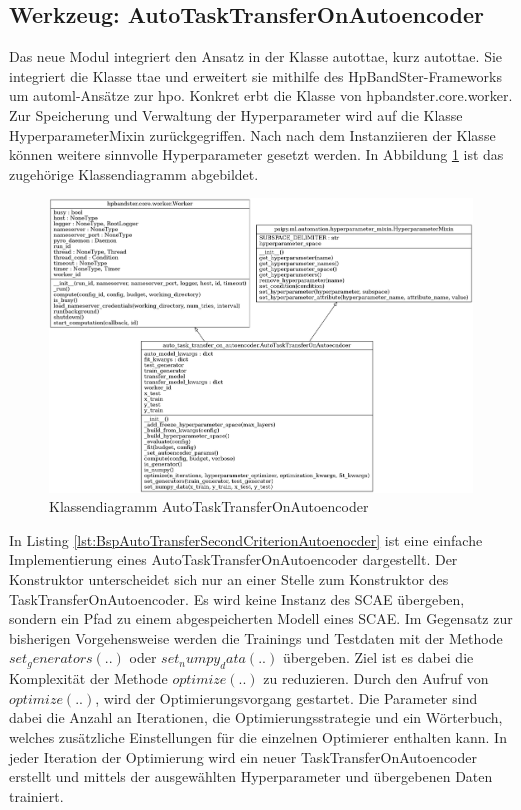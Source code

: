 	\subsection{Werkzeug: AutoTaskTransferOnAutoencoder}
	\label{subsec:AutoTaskTransferOnAutoencoder}
	Das neue Modul integriert den Ansatz in der Klasse \acl{autottae}, kurz \ac{autottae}. Sie integriert die Klasse \acl{ttae} und erweitert sie mithilfe des HpBandSter-Frameworks um \ac{automl}-Ansätze zur \ac{hpo}. Konkret erbt die Klasse von hpbandster.core.worker. Zur Speicherung und Verwaltung der Hyperparameter wird auf die Klasse HyperparameterMixin zurückgegriffen. Nach nach dem Instanziieren der Klasse können weitere sinnvolle Hyperparameter gesetzt werden.
	In Abbildung \ref{img:KlassendiagrammAutoTaskTransferOnAutoencoder}  ist das zugehörige Klassendiagramm abgebildet. 
	\begin{figure}[h]
		\centering
		\includegraphics[width=1\textwidth, center]{bilder/Klassendiagramme/AutoTTAE.png}
		\caption[Klassendiagramm AutoTaskTransferOnAutoencoder]{Klassendiagramm AutoTaskTransferOnAutoencoder}
		\label{img:KlassendiagrammAutoTaskTransferOnAutoencoder}
	\end{figure}  
	In Listing \ref{lst:BspAutoTransferSecondCriterionAutoenocder} ist eine einfache Implementierung eines AutoTaskTransferOnAutoencoder dargestellt. Der Konstruktor unterscheidet sich nur an einer Stelle zum Konstruktor des TaskTransferOnAutoencoder. Es wird keine Instanz des SCAE übergeben, sondern ein Pfad zu einem abgespeicherten Modell eines SCAE. 
	Im Gegensatz zur bisherigen Vorgehensweise werden die Trainings und Testdaten mit der Methode $set_generators(..)$  oder $set_numpy_data(..)$ übergeben. Ziel ist es dabei die Komplexität der Methode $optimize(..)$ zu reduzieren. Durch den Aufruf von $optimize(..)$, wird der Optimierungsvorgang gestartet. Die Parameter sind dabei die Anzahl an Iterationen, die Optimierungsstrategie und ein Wörterbuch, welches zusätzliche Einstellungen für die einzelnen Optimierer enthalten kann. In jeder Iteration der Optimierung wird ein neuer TaskTransferOnAutoencoder erstellt und mittels der ausgewählten Hyperparameter und übergebenen Daten trainiert. 

